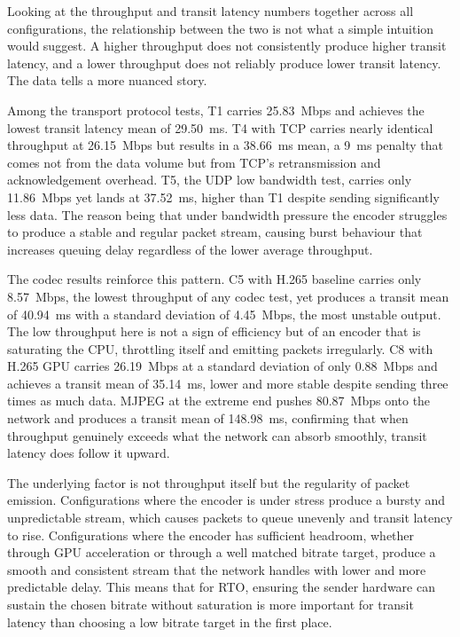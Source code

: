 Looking at the throughput and transit latency numbers together across all configurations, the relationship between the two is not what a simple intuition would suggest. A higher throughput does not consistently produce higher transit latency, and a lower throughput does not reliably produce lower transit latency. The data tells a more nuanced story.

Among the transport protocol tests, T1 carries 25.83~Mbps and achieves the lowest transit latency mean of 29.50~ms. T4 with TCP carries nearly identical throughput at 26.15~Mbps but results in a 38.66~ms mean, a 9~ms penalty that comes not from the data volume but from TCP's retransmission and acknowledgement overhead. T5, the UDP low bandwidth test, carries only 11.86~Mbps yet lands at 37.52~ms, higher than T1 despite sending significantly less data. The reason being that under bandwidth pressure the encoder struggles to produce a stable and regular packet stream, causing burst behaviour that increases queuing delay regardless of the lower average throughput.

The codec results reinforce this pattern. C5 with H.265 baseline carries only 8.57~Mbps, the lowest throughput of any codec test, yet produces a transit mean of 40.94~ms with a standard deviation of 4.45~Mbps, the most unstable output. The low throughput here is not a sign of efficiency but of an encoder that is saturating the CPU, throttling itself and emitting packets irregularly. C8 with H.265 GPU carries 26.19~Mbps at a standard deviation of only 0.88~Mbps and achieves a transit mean of 35.14~ms, lower and more stable despite sending three times as much data. MJPEG at the extreme end pushes 80.87~Mbps onto the network and produces a transit mean of 148.98~ms, confirming that when throughput genuinely exceeds what the network can absorb smoothly, transit latency does follow it upward.

The underlying factor is not throughput itself but the regularity of packet emission. Configurations where the encoder is under stress produce a bursty and unpredictable stream, which causes packets to queue unevenly and transit latency to rise. Configurations where the encoder has sufficient headroom, whether through GPU acceleration or through a well matched bitrate target, produce a smooth and consistent stream that the network handles with lower and more predictable delay. This means that for RTO, ensuring the sender hardware can sustain the chosen bitrate without saturation is more important for transit latency than choosing a low bitrate target in the first place.

